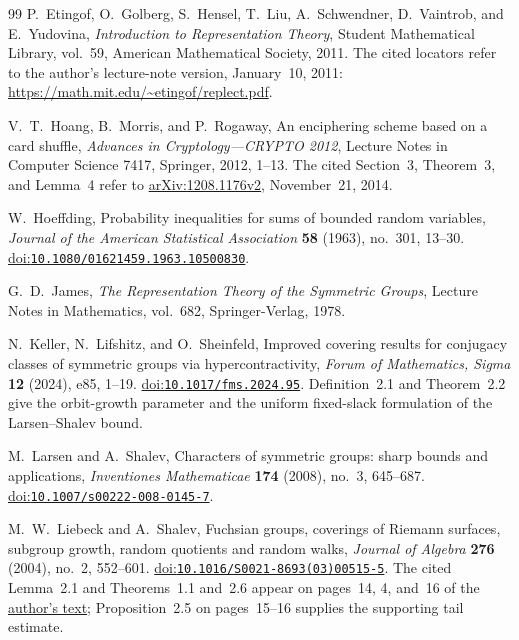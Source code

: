 \begin{thebibliography}{99}
P.~Etingof, O.~Golberg, S.~Hensel, T.~Liu, A.~Schwendner,
D.~Vaintrob, and E.~Yudovina,
\emph{Introduction to Representation Theory},
Student Mathematical Library, vol.~59, American Mathematical Society, 2011.
The cited locators refer to the author's lecture-note version,
January~10, 2011:
\url{https://math.mit.edu/~etingof/replect.pdf}.

V.~T.~Hoang, B.~Morris, and P.~Rogaway,
An enciphering scheme based on a card shuffle,
\emph{Advances in Cryptology---CRYPTO 2012},
Lecture Notes in Computer Science 7417, Springer, 2012, 1--13.
The cited Section~3, Theorem~3, and Lemma~4 refer to
\href{https://arxiv.org/abs/1208.1176v2}{arXiv:1208.1176v2},
November~21, 2014.

W.~Hoeffding,
Probability inequalities for sums of bounded random variables,
\emph{Journal of the American Statistical Association} \textbf{58}
(1963), no.~301, 13--30.
\href{https://doi.org/10.1080/01621459.1963.10500830}{doi:\nolinkurl{10.1080/01621459.1963.10500830}}.

G.~D.~James,
\emph{The Representation Theory of the Symmetric Groups},
Lecture Notes in Mathematics, vol.~682, Springer-Verlag, 1978.

N.~Keller, N.~Lifshitz, and O.~Sheinfeld,
Improved covering results for conjugacy classes of symmetric groups
via hypercontractivity,
\emph{Forum of Mathematics, Sigma} \textbf{12} (2024), e85, 1--19.
\href{https://doi.org/10.1017/fms.2024.95}{doi:\nolinkurl{10.1017/fms.2024.95}}.
Definition~2.1 and Theorem~2.2 give the orbit-growth parameter and
the uniform fixed-slack formulation of the Larsen--Shalev bound.

M.~Larsen and A.~Shalev,
Characters of symmetric groups: sharp bounds and applications,
\emph{Inventiones Mathematicae} \textbf{174} (2008), no.~3, 645--687.
\href{https://doi.org/10.1007/s00222-008-0145-7}{doi:\nolinkurl{10.1007/s00222-008-0145-7}}.

M.~W.~Liebeck and A.~Shalev,
Fuchsian groups, coverings of Riemann surfaces, subgroup growth,
random quotients and random walks,
\emph{Journal of Algebra} \textbf{276} (2004), no.~2, 552--601.
\href{https://doi.org/10.1016/S0021-8693(03)00515-5}{doi:\nolinkurl{10.1016/S0021-8693(03)00515-5}}.
The cited Lemma~2.1 and Theorems~1.1 and~2.6 appear on pages~14, 4,
and~16 of the
\href{https://spiral.imperial.ac.uk/bitstreams/aa106926-a412-470a-8e0e-f513d424120e/download}{author's text};
Proposition~2.5 on pages~15--16 supplies the supporting tail estimate.


\end{thebibliography}
